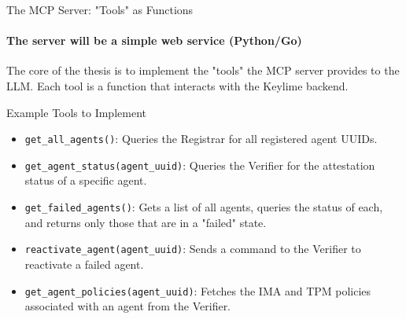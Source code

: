 \documentclass{beamer}
\begin{document}
\begin{frame}{The MCP Server: "Tools" as Functions}
    \framesubtitle{The server will be a simple web service (Python/Go)}

    The core of the thesis is to implement the "tools" the MCP server provides to the LLM. Each tool is a function that interacts with the Keylime backend.

    \begin{block}{Example Tools to Implement}
    \begin{itemize}
        \item \texttt{get\_all\_agents()}: Queries the Registrar for all registered agent UUIDs.
        \item \texttt{get\_agent\_status(agent\_uuid)}: Queries the Verifier for the attestation status of a specific agent.
        \item \texttt{get\_failed\_agents()}: Gets a list of all agents, queries the status of each, and returns only those that are in a "failed" state.
        \item \texttt{reactivate\_agent(agent\_uuid)}: Sends a command to the Verifier to reactivate a failed agent.
        \item \texttt{get\_agent\_policies(agent\_uuid)}: Fetches the IMA and TPM policies associated with an agent from the Verifier.
    \end{itemize}
    \end{block}
\end{frame}
\end{document}

